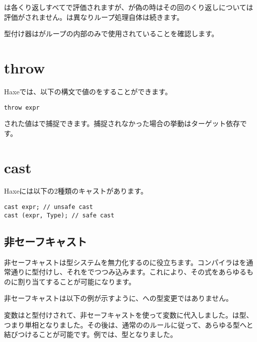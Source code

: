 は各くり返しすべてで評価されますが、が偽の時はその回のくり返しについては評価がされません。は異なりループ処理自体は続きます。

型付け器はがループの内部のみで使用されていることを確認します。

\section{throw}
\label{expression-throw}

Haxeでは、以下の構文で値のをすることができます。

\begin{lstlisting}
throw expr
\end{lstlisting}

された値はで捕捉できます。捕捉されなかった場合の挙動はターゲット依存です。

\section{cast}
\label{expression-cast}

Haxeには以下の2種類のキャストがあります。

\begin{lstlisting}
cast expr; // unsafe cast
cast (expr, Type); // safe cast
\end{lstlisting}

\subsection{非セーフキャスト}
\label{expression-cast-unsafe}

非セーフキャストは型システムを無力化するのに役立ちます。コンパイラはを通常通りに型付けし、それをでつつみ込みます。これにより、その式をあらゆるものに割り当てすることが可能になります。

非セーフキャストは以下の例が示すように、への型変更ではありません。


変数はと型付けされて、非セーフキャストを使って変数に代入しました。は型、つまり単相となりました。その後は、通常ののルールに従って、あらゆる型へと結びつけることが可能です。例では、型となりました。

